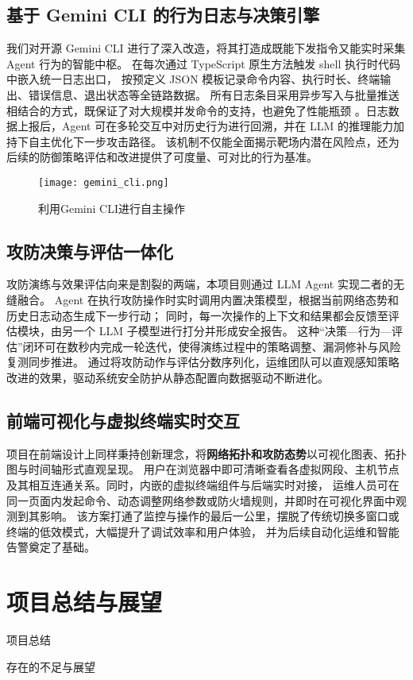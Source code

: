 \documentclass[lang=cn,10pt]{elegantbook}
\begin{document}
\section{基于 Gemini CLI 的行为日志与决策引擎}  
我们对开源 Gemini CLI 进行了深入改造，将其打造成既能下发指令又能实时采集 Agent 行为的智能中枢。
在每次通过 TypeScript 原生方法触发 shell 执行时代码中嵌入统一日志出口，
按预定义 JSON 模板记录命令内容、执行时长、终端输出、错误信息、退出状态等全链路数据。
所有日志条目采用异步写入与批量推送相结合的方式，既保证了对大规模并发命令的支持，也避免了性能瓶颈
。日志数据上报后，Agent 可在多轮交互中对历史行为进行回溯，并在 LLM 的推理能力加持下自主优化下一步攻击路径。
该机制不仅能全面揭示靶场内潜在风险点，还为后续的防御策略评估和改进提供了可度量、可对比的行为基准。
\begin{figure}[!h]
\centering
\texttt{[image: gemini\_cli.png]}  %
\caption{利用Gemini CLI进行自主操作}  %
\label{fig:Gemini}  %
\end{figure}
\section{攻防决策与评估一体化}  
攻防演练与效果评估向来是割裂的两端，本项目则通过 LLM Agent 实现二者的无缝融合。
Agent 在执行攻防操作时实时调用内置决策模型，根据当前网络态势和历史日志动态生成下一步行动；
同时，每一次操作的上下文和结果都会反馈至评估模块，由另一个 LLM 子模型进行打分并形成安全报告。
这种“决策—行为—评估”闭环可在数秒内完成一轮迭代，使得演练过程中的策略调整、漏洞修补与风险复测同步推进。
通过将攻防动作与评估分数序列化，运维团队可以直观感知策略改进的效果，驱动系统安全防护从静态配置向数据驱动不断进化。

\section{前端可视化与虚拟终端实时交互}  
项目在前端设计上同样秉持创新理念，将\textbf{网络拓扑和攻防态势}以可视化图表、拓扑图与时间轴形式直观呈现。
用户在浏览器中即可清晰查看各虚拟网段、主机节点及其相互连通关系。同时，内嵌的虚拟终端组件与后端实时对接，
运维人员可在同一页面内发起命令、动态调整网络参数或防火墙规则，并即时在可视化界面中观测到其影响。
该方案打通了监控与操作的最后一公里，摆脱了传统切换多窗口或终端的低效模式，大幅提升了调试效率和用户体验，
并为后续自动化运维和智能告警奠定了基础。


\chapter{项目总结与展望}
\begin{introduction}
  \item 项目总结
  \item 存在的不足与展望
\end{introduction}
\end{document}
